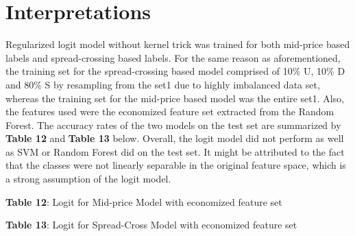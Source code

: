 \documentclass[11pt]{article}
\begin{document}
\section{Interpretations}
Regularized logit model without kernel trick was trained for both mid-price based labels and spread-crossing based labels. For the same reason as aforementioned, the training set for the spread-crossing based model comprised of 10\% U, 10\% D and 80\% S by resampling from the set1 due to highly imbalanced data set, whereas the training set for the mid-price based model was the entire set1. Also, the features used were the economized feature set extracted from the Random Forest. The accuracy rates of the two models on the test set are summarized by \textbf{Table 12} and \textbf{Table 13} below. Overall, the logit model did not perform as well as SVM or Random Forest did on the test set. It might be attributed to the fact that the classes were not linearly separable in the original feature space, which is a strong assumption of the logit model.
\begin{multicols}{2}
\begin{center}
\renewcommand{\arraystretch}{1.4}

\vspace{0.5 cm}
\small \textbf{Table 12}: Logit for Mid-price Model with economized feature set
\end{center}

\begin{center}
\renewcommand{\arraystretch}{1.4}

\vspace{0.5 cm}
\small \textbf{Table 13}: Logit for Spread-Cross Model with economized feature set
\end{center}
\end{multicols}
\end{document}
